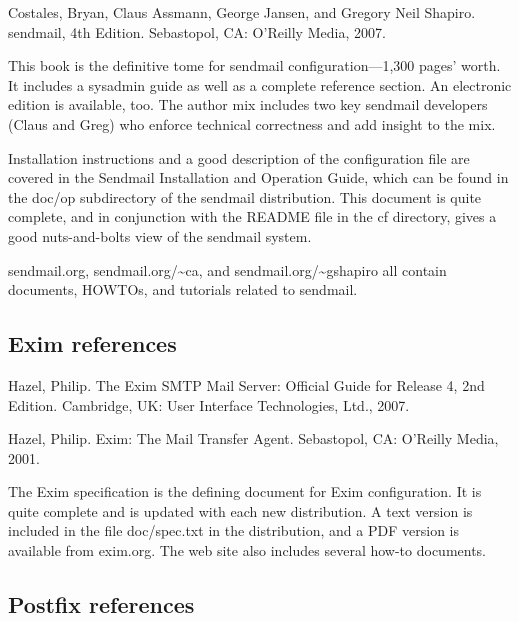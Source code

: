 {Costales, Bryan, Claus Assmann, George Jansen, and Gregory Neil
Shapiro}. {sendmail, 4th Edition.} Sebastopol, CA: O'Reilly Media, 2007.

This book is the definitive tome for {sendmail} configuration---1,300
pages' worth. It includes a sysadmin guide as well as a complete
reference section. An electronic edition is available, too. The author
mix includes two key {sendmail} developers (Claus and Greg) who enforce
technical correctness and add insight to the mix.

Installation instructions and a good description of the configuration
file are covered in the {Sendmail Installation and Operation Guide},
which can be found in the {doc/op} subdirectory of the {sendmail}
distribution. This document is quite complete, and in conjunction with
the {README} file in the {cf} directory, gives a good nuts-and-bolts
view of the {sendmail} system.

sendmail.org, sendmail.org/\textasciitilde ca, and
sendmail.org/\textasciitilde gshapiro all contain documents, HOWTOs, and
tutorials related to {sendmail}.

\protect\hypertarget{part0026_split_067.html}{}{}

\hypertarget{part0026_split_067.htmlux5cux23_idContainer1247}{}
\hypertarget{part0026_split_067.htmlux5cux23calibre_pb_66}{%
\subsection[Exim
references]{\texorpdfstring{\protect\hypertarget{part0026_split_067.htmlux5cux23_idTextAnchor1204}{}{}Exim
references}{Exim references}}\label{part0026_split_067.htmlux5cux23calibre_pb_66}}

{Hazel, Philip}. {The Exim SMTP Mail Server: Official Guide for Release
4, 2nd Edition}. Cambridge, UK: User Interface Technologies, Ltd., 2007.

{Hazel, Philip}. {Exim: The Mail Transfer Agent}. Sebastopol, CA:
O'Reilly Media, 2001.

The Exim specification is the defining document for Exim configuration.
It is quite complete and is updated with each new distribution. A text
version is included in the file {doc/spec.txt} in the distribution, and
a PDF version is available from {exim.org}. The web site also includes
several how-to documents.

\protect\hypertarget{part0026_split_068.html}{}{}

\hypertarget{part0026_split_068.htmlux5cux23_idContainer1247}{}
\hypertarget{part0026_split_068.htmlux5cux23calibre_pb_67}{%
\subsection[Postfix
references]{\texorpdfstring{\protect\hypertarget{part0026_split_068.htmlux5cux23_idTextAnchor1205}{}{}Postfix
references}{Postfix references}}\label{part0026_split_068.htmlux5cux23calibre_pb_67}}

